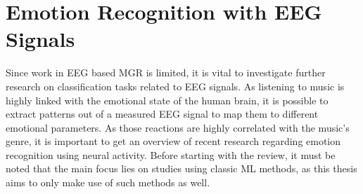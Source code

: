   \section{Emotion Recognition with EEG Signals}\label{sec:emotion_eeg}
Since work in \ac{EEG} based \ac{MGR} is limited, it is vital to investigate further research on classification tasks related to \ac{EEG} signals. As listening to music is highly linked with the emotional state of the human brain, it is possible to extract patterns out of a measured \ac{EEG} signal to map them to different emotional parameters. As those reactions are highly correlated with the music's genre, it is important to get an overview of recent research regarding emotion recognition using neural activity. Before starting with the review, it must be noted that the main focus lies on studies using classic \ac{ML} methods, as this thesis aims to only make use of such methods as well.\par 

